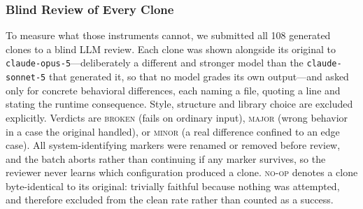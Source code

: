 \subsubsection{Blind Review of Every Clone}
\label{sec:blindreview}

To measure what those instruments cannot, we submitted all 108 generated clones to a blind LLM review. Each clone was shown alongside its original to \texttt{claude-opus-5}---deliberately a different and stronger model than the \texttt{claude-sonnet-5} that generated it, so that no model grades its own output---and asked only for concrete behavioral differences, each naming a file, quoting a line and stating the runtime consequence. Style, structure and library choice are excluded explicitly. Verdicts are \textsc{broken} (fails on ordinary input), \textsc{major} (wrong behavior in a case the original handled), or \textsc{minor} (a real difference confined to an edge case). All system-identifying markers were renamed or removed before review, and the batch aborts rather than continuing if any marker survives, so the reviewer never learns which configuration produced a clone. \textsc{no-op} denotes a clone byte-identical to its original: trivially faithful because nothing was attempted, and therefore excluded from the clean rate rather than counted as a success.

\begin{table}[t]
\centering
{}
\caption{Blind review of all 108 generated clones by an independent, stronger model with every system-identifying marker removed. The clean rate excludes \textsc{no-op} clones, which attempted nothing. One single-shot run has no verdict---the reviewer returned an empty completion on four attempts with exponential backoff---so that configuration's denominator is 35.}
\label{tab:judge}
\end{table}

